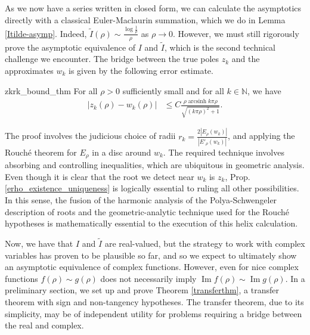 \documentclass{amsart}
\theoremstyle{plain}
\numberwithin{theorem}{section}
\DeclareMathOperator{\arcsinh}{arcsinh}
\DeclareMathOperator{\Imz}{Im}
\theoremstyle{definition}
\theoremstyle{remark}
\theoremstyle{brakets}
\newcommand{\N}{\mathbb{N}}
\begin{document}
As we now have a series written in closed form, we can calculate the asymptotics directly with a classical Euler-Maclaurin summation, which we do in Lemma \ref{Itilde-asymp}. Indeed, $\tilde{I}(\rho) \sim \frac{\log \frac{1}{\rho}}{\rho}$ as $\rho \to 0$. However, we must still rigorously prove the asymptotic equivalence of $I$ and $\tilde{I}$, which is the second technical challenge we encounter. The bridge between the true poles $z_k$ and the approximates $w_k$ is given by the following error estimate.
\begin{repprop}{zkrk_bound_thm}
    For all $\rho > 0$ sufficiently small and for all $k \in \N$, we have
    \begin{align*}
        |z_k(\rho) - w_k(\rho)| &\leq C \frac{\rho \arcsinh k\pi\rho}{\sqrt{(k\pi\rho)^2 + 1}}.
    \end{align*}
\end{repprop}
The proof involves the judicious choice of radii $r_k = \frac{2|E_\rho(w_k)|}{|E'_\rho(w_k)|}$, and applying the Rouch\'e theorem for $E_\rho$ in a disc around $w_k$. The required technique involves absorbing and controlling inequalities, which are ubiquitous in geometric analysis. Even though it is clear that the root we detect near $w_k$ is $z_k$, Prop. \ref{erho_existence_uniqueness} is logically essential to ruling all other possibilities. In this sense, the fusion of the harmonic analysis of the Polya-Schwengeler description of roots and the geometric-analytic technique used for the Rouch\'e hypotheses is mathematically essential to the execution of this helix calculation.

Now, we have that $I$ and $\tilde{I}$ are real-valued, but the strategy to work with complex variables has proven to be plausible so far, and so we expect to ultimately show an asymptotic equivalence of complex functions. However, even for nice complex functions $f(\rho) \sim g(\rho)$ does not necessarily imply $\Imz f(\rho) \sim \Imz g(\rho)$. In a preliminary section, we set up and prove Theorem \ref{transferthm}, a transfer theorem with sign and non-tangency hypotheses. The transfer theorem, due to its simplicity, may be of independent utility for problems requiring a bridge between the real and complex.
\end{document}
